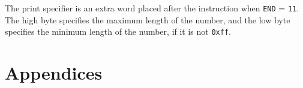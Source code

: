 \documentclass[hidelinks,11pt]{article}
\newcommand{\gap}{\bigskip\noindent}
\newlength{\bit}
\begin{document}
\gap
The print specifier is an extra word placed after the instruction when \texttt{END} = \texttt{11}. The high byte specifies the maximum length of the number, and the low byte specifies the minimum length of the number, if it is not \texttt{0xff}.

\pagebreak
\part{Appendices}
\appendix




\end{document}
